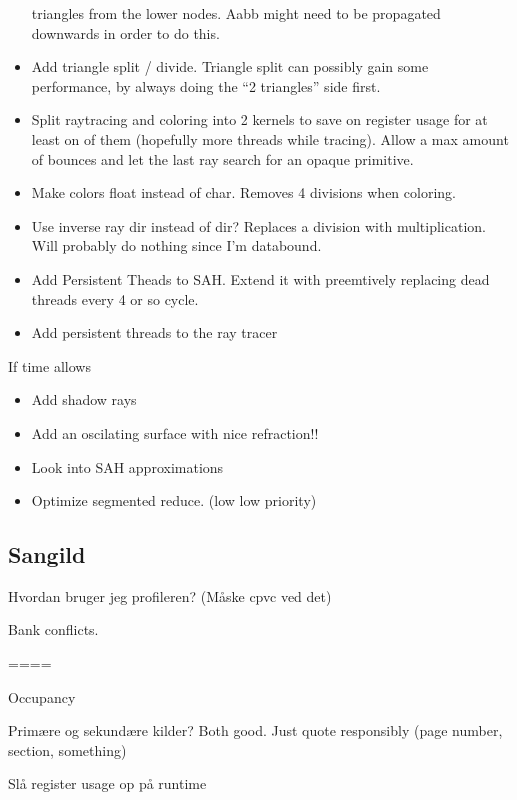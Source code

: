 \begin{itemize}
  triangles from the lower nodes. Aabb might need to be propagated
  downwards in order to do this.
\item Add triangle split / divide. Triangle split can possibly gain
  some performance, by always doing the ``2 triangles'' side first.
\item Split raytracing and coloring into 2 kernels to save on register
  usage for at least on of them (hopefully more threads while
  tracing). Allow a max amount of bounces and let the last ray search
  for an opaque primitive.
\item Make colors float instead of char. Removes 4 divisions when coloring.
\item Use inverse ray dir instead of dir? Replaces a division with
  multiplication. Will probably do nothing since I'm databound.
\item Add Persistent Theads to SAH. Extend it with preemtively
  replacing dead threads every 4 or so cycle.
\item Add persistent threads to the ray tracer
\end{itemize}

If time allows

\begin{itemize}
\item Add shadow rays
\item Add an oscilating surface with nice refraction!!
\item Look into SAH approximations
\item Optimize segmented reduce. (low low priority)
\end{itemize}




\subsection*{Sangild}

Hvordan bruger jeg profileren? (Måske cpvc ved det)

Bank conflicts.

====

Occupancy

Primære og sekundære kilder? Both good. Just quote responsibly (page
number, section, something)

Slå register usage op på runtime
